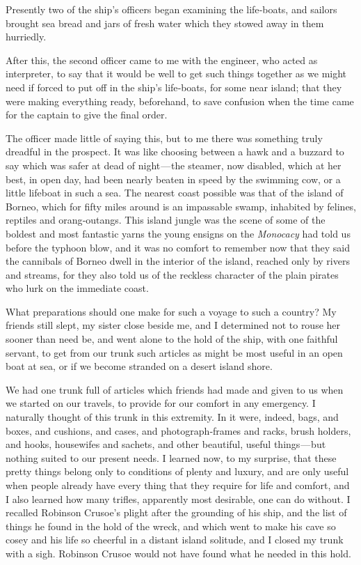 \documentclass[12pt]{book}
\begin{document}
Presently two of the ship’s officers began examining the life‐boats, and sailors
brought sea bread and jars of fresh water which they stowed away in them
hurriedly.

After this, the second officer came to me with the engineer, who acted as
interpreter, to say that it would be well to get such things together as we might
need if forced to put off in the ship’s life‐boats, for some near island; that they
were making everything ready, beforehand, to save confusion when the time
came for the captain to give the final order.

The officer made little of saying this, but to me there was something truly
dreadful in the prospect. It was like choosing between a hawk and a buzzard
to say which was safer at dead of night — the steamer, now disabled, which at
her best, in open day, had been nearly beaten in speed by the swimming cow, or
a little lifeboat in such a sea. The nearest coast possible was that of the island
of Borneo, which for fifty miles around is an impassable swamp, inhabited by
felines, reptiles and orang‐outangs. This island jungle was the scene of some of
the boldest and most fantastic yarns the young ensigns on the {\it Monocacy} had told
us before the typhoon blow, and it was no comfort to remember now that they
said the cannibals of Borneo dwell in the interior of the island, reached only by
rivers and streams, for they also told us of the reckless character of the plain
pirates who lurk on the immediate coast.

What preparations should one make for such a voyage to such a country? My
friends still slept, my sister close beside me, and I determined not to rouse her
sooner than need be, and went alone to the hold of the ship, with one faithful
servant, to get from our trunk such articles as might be most useful in an open
boat at sea, or if we become stranded on a desert island shore.

We had one trunk full of articles which friends had made and given to us when
we started on our travels, to provide for our comfort in any emergency. I naturally
thought of this trunk in this extremity. In it were, indeed, bags, and boxes, and
cushions, and cases, and photograph‐frames and racks, brush holders, and hooks,
housewifes and sachets, and other beautiful, useful things — but nothing suited to
our present needs. I learned now, to my surprise, that these pretty things belong
only to conditions of plenty and luxury, and are only useful when people already
have every thing that they require for life and comfort, and I also learned how
many trifles, apparently most desirable, one can do without. I recalled Robinson
Crusoe’s plight after the grounding of his ship, and the list of things he found in
the hold of the wreck, and which went to make his cave so cosey and his life so
cheerful in a distant island solitude, and I closed my trunk with a sigh. Robinson
Crusoe would not have found what he needed in this hold.
\end{document}
